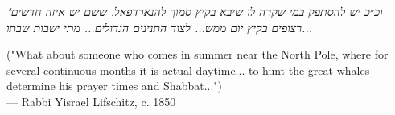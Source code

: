 
\begin{flushright}
\begin{hebrew}
\emph{"וכ״כ יש להסתפק במי שקרה לו שיבא בקיץ סמוך להנארדפאל. ששם יש איזה חדשים רצופים בקיץ יום ממש... לצוד התנינים הגדולים... מתי ישבות שבתו...}\\
\end{hebrew}
("What about someone who comes in summer near the North Pole, where for several continuous months it is actual daytime... to hunt the great whales — determine his prayer times and Shabbat...")\\
— Rabbi Yisrael Lifschitz, c. 1850
\end{flushright}